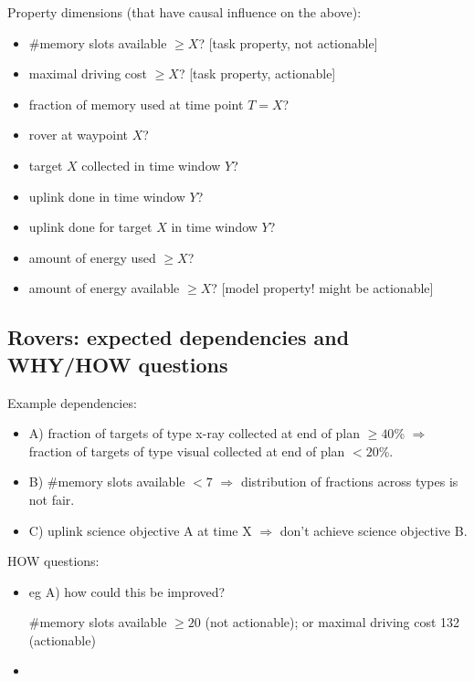 Property dimensions (that have causal influence on the above):
\begin{itemize}
\item \#memory slots available $\geq X$? [task property, not actionable]
\item maximal driving cost $\geq X$? [task property, actionable]
\item fraction of memory used at time point $T = X$?
\item rover at waypoint $X$?
\item target $X$ collected in time window $Y$?
\item uplink done in time window $Y$?
\item uplink done for target $X$ in time window $Y$?
\item amount of energy used $\geq X$?
\item amount of energy available $\geq X$? [model property! might be
  actionable]
\end{itemize}







\subsection{Rovers: expected dependencies and WHY/HOW questions}
\label{xpp-rovers:whyhow}


Example dependencies:
\begin{itemize}
\item A) fraction of targets of type x-ray collected at end of plan
  $\geq 40$\% $\Rightarrow$ fraction of targets of type visual
  collected at end of plan $< 20$\%.
\item B) \#memory slots available $< 7$ $\Rightarrow$ distribution of
  fractions across types is not fair.
\item C) uplink science objective A at time X $\Rightarrow$ don't
  achieve science objective B.
\end{itemize}

HOW questions: 
\begin{itemize}
\item eg A) how could this be improved? 

  \#memory slots available $\geq 20$ (not actionable); or maximal
  driving cost 132 (actionable)
\item 
\end{itemize}


